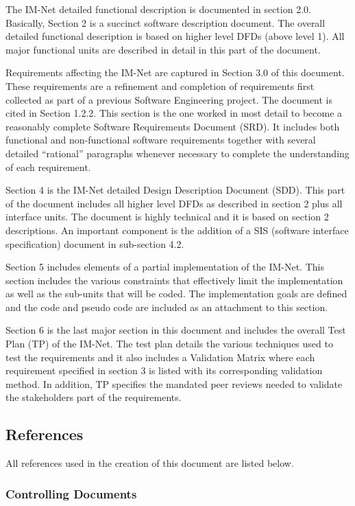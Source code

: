 \documentclass[letterpaper]{article}
\begin{document}
{The IM-Net detailed functional description is documented in section 2.0. Basically, Section 2 is a succinct software description document. The overall detailed functional description is based on higher level DFDs (above level 1). All major functional units are described in detail in this part of the document.

Requirements affecting the IM-Net are captured in Section 3.0 of this document.  These requirements are a refinement and completion of requirements first collected as part of a previous Software Engineering project. The document is cited in Section 1.2.2. This section is the one worked in most detail to become a reasonably complete Software Requirements Document (SRD). It includes both functional and non-functional software requirements together with several detailed ``rational'' paragraphs whenever necessary to complete the understanding of each requirement.

Section 4 is the IM-Net detailed Design Description Document (SDD). This part of the document includes all higher level DFDs as described in section 2 plus all interface units. The document is highly technical and it is based on section 2 descriptions. An important component is the addition of a SIS (software interface specification) document in sub-section 4.2.

Section 5 includes elements of a partial implementation of the IM-Net. This section includes the various constraints that effectively limit the implementation as well as the sub-units that will be coded. The implementation goals are defined and the code and pseudo code are included as an attachment to this section.  

Section 6 is the last major section in this document and includes the overall Test Plan (TP) of the IM-Net. The test plan details the various techniques used to test the requirements and it also includes a Validation Matrix where each requirement specified in section 3 is listed with its corresponding validation method. In addition, TP specifies the mandated peer reviews needed to validate the stakeholders part of the requirements.

 
\textcolor{subsection}{\subsection{References}}

All references used in the creation of this document are listed below.

\textcolor{subsubsection}{\subsubsection{Controlling Documents}}

}
\end{document}
